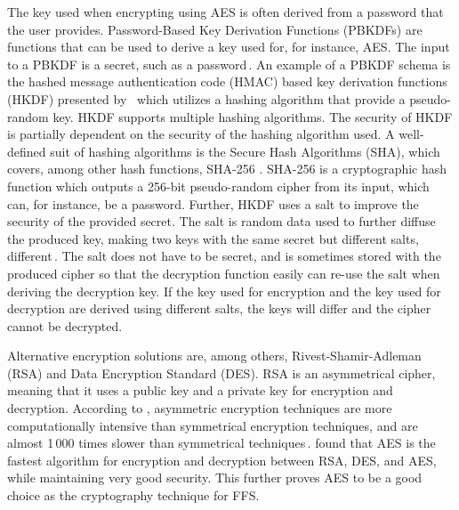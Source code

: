 The key used when encrypting using AES is often derived from a password that the user provides. Password-Based Key Derivation Functions (\gls{PBKDF}s) are functions that can be used to derive a key used for, for instance, AES. The input to a PBKDF is a secret, such as a password\,\cite{kodwaniSecurityKeyDerivation2021}. An example of a PBKDF schema is the hashed message authentication code (\gls{HMAC}) based key derivation functions (\gls{HKDF}) presented by \citeauthor{krawczykCryptographicExtractionKey2010}\,\cite{krawczykCryptographicExtractionKey2010}\cite{krawczykHMACbasedExtractandExpandKey2010} which utilizes a hashing algorithm that provide a pseudo-random key. HKDF supports multiple hashing algorithms. The security of HKDF is partially dependent on the security of the hashing algorithm used. A well-defined suit of hashing algorithms is the Secure Hash Algorithms (\gls{SHA}), which covers, among other hash functions, SHA-256 \cite{hansenUSSecureHash2011}. SHA-256 is a cryptographic hash function which outputs a 256-bit pseudo-random cipher from its input, which can, for instance, be a password. Further, HKDF uses a salt to improve the security of the provided secret. The salt is random data used to further diffuse the produced key, making two keys with the same secret but different salts, different\,\cite{ariasAddingSaltHashing2021}. The salt does not have to be secret, and is sometimes stored with the produced cipher so that the decryption function easily can re-use the salt when deriving the decryption key. If the key used for encryption and the key used for decryption are derived using different salts, the keys will differ and the cipher cannot be decrypted.

Alternative encryption solutions are, among others, Rivest-Shamir-Adleman (\gls{RSA}) and Data Encryption Standard (\gls{DES}). RSA is an asymmetrical cipher, meaning that it uses a public key and a private key for encryption and decryption. According to \citeauthor{mahajanStudyEncryptionAlgorithms2013}, asymmetric encryption techniques are more computationally intensive than symmetrical encryption techniques, and are almost 1\,000 times slower than symmetrical techniques\,\cite{mahajanStudyEncryptionAlgorithms2013}. \citeauthor{mahajanStudyEncryptionAlgorithms2013} found that AES is the fastest algorithm for encryption and decryption between RSA, DES, and AES, while maintaining very good security. This further proves AES to be a good choice as the cryptography technique for FFS.